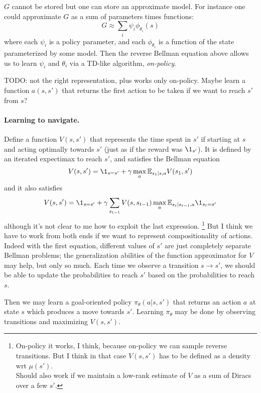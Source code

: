\documentclass[11pt,a4paper]{article}
\begin{document}
$G$ cannot be stored but one can store an approximate model. For instance
one could approximate $G$ as a sum of parameters times functions:
\begin{equation}
G\approx \sum_i \psi_i \phi_{\theta_i}(s)
\end{equation}
where each $\psi_i$ is a policy parameter, and each $\phi_{\theta_i}$ is
a function of the state parameterized by some model. Then the reverse
Bellman equation above allows us to learn $\psi_i$ and $\theta_i$ via 
a TD-like algorithm, \emph{on-policy}.

TODO: not the right representation, plus works only on-policy. Maybe learn a function $a(s,s')$ that
returns the first action to be taken if we want to reach $s'$ from $s$?

\paragraph{Learning to navigate.} Define a function $V(s,s')$ that
represents the time spent in $s'$ if starting at $s$ and acting optimally
towards $s'$ (just as if the reward was $\1_{s'}$). It is defined by an iterated expectimax to reach $s'$, and
satisfies the Bellman equation
\begin{equation}
V(s,s')=\1_{s=s'}+\gamma \max_a \E_{s_1|s,a} V(s_1,s')
\end{equation}
and it also satisfies
\begin{equation}
V(s,s')=\1_{s=s'}+\gamma \sum_{s_{t-1}} V(s,s_{t-1})\max_a
\E_{s_t|s_{t-1},a}\1_{s_t=s'}
\end{equation}
although it's not clear to me how to exploit the last expression. 
\footnote{On-policy it works, I think, because on-policy we can sample
reverse transitions. But I think in that case $V(s,s')$ has to be defined
as a density wrt $\mu(s')$.\\Should also work if we maintain a low-rank
estimate of $V$ as a sum of Diracs over a few $s'$.}
But I
think we have to work from both ends if we want to represent
compositionality of actions. Indeed with the first equation, different values
of $s'$ are just completely separate Bellman problems; the generalization
abilities of the function approximator for $V$ may help, but only so
much. Each time we observe a transition $s\to s'$, we should be able to
update the probabilities to reach $s'$ based on the probabilities to
reach $s$.

Then we may learn a goal-oriented policy $\pi_\theta(a|s,s')$ that returns an
action $a$ at state $s$ which produces a move towards $s'$. Learning
$\pi_\theta$ may be done by observing transitions and maximizing
$V(s,s')$.
\end{document}
